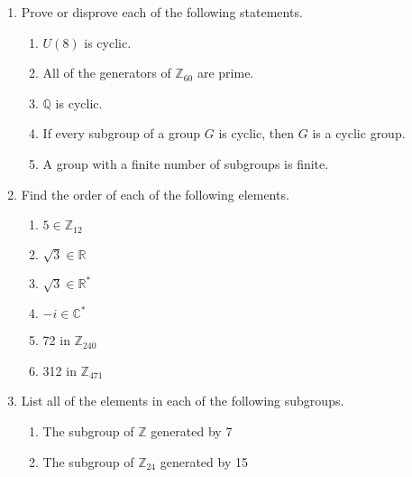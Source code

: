  
{\small
\begin{enumerate}
 
 
\item
Prove or disprove each of the following statements.
\begin{enumerate}
 
 \item
$U(8)$ is cyclic.
 
 \item
All of the generators of ${\mathbb Z}_{60}$ are prime.
 
 \item
${\mathbb Q}$ is cyclic.
 
 \item
If every subgroup of a group $G$ is cyclic, then $G$ is a cyclic
group. 
 
 \item
A group with a finite number of subgroups is finite.
 
\end{enumerate}
 
  
\item
Find the order of each of the following elements.
\begin{multicols}{3}
\begin{enumerate}

\item
$5 \in {\mathbb Z}_{12}$

\item
$\sqrt{3} \in {\mathbb R}$
 
\item
$\sqrt{3} \in {\mathbb R}^\ast$
 
\item
$-i \in {\mathbb C}^\ast$

\item
72 in ${\mathbb Z}_{240}$
 
\item
312 in ${\mathbb Z}_{471}$
 
 \end{enumerate}
 \end{multicols}
  
\item
List all of the elements in each of the following subgroups.
\begin{enumerate}
 
 \item
The subgroup of ${\mathbb Z}$ generated by 7
 
 \item
The subgroup of ${\mathbb Z}_{24}$ generated by 15
 

\end{enumerate}
\end{enumerate}}

